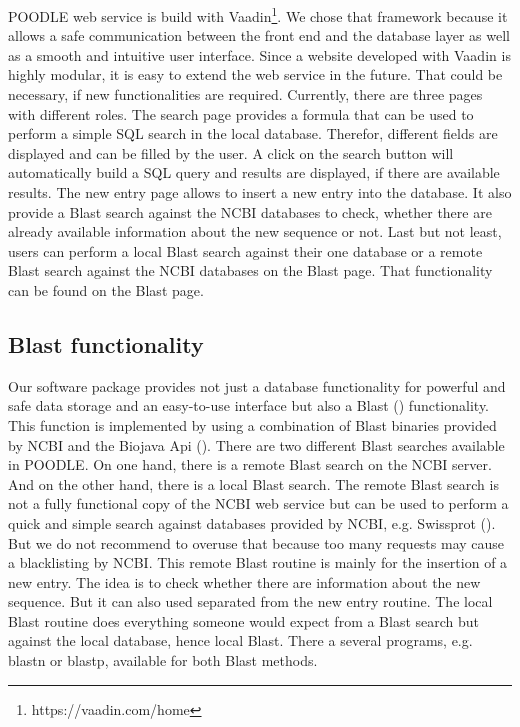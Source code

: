 \documentclass{bioinfo}
\begin{document}
\begin{methods}
POODLE web service is build with Vaadin\footnote{https://vaadin.com/home}. We chose that framework 
because it allows a safe 
communication between the front end and the database layer as well as a smooth and intuitive user 
interface. Since a website developed with Vaadin is highly modular, it is easy to extend the web 
service in the future. That could be necessary, if new functionalities are required. Currently, 
there are three pages with different roles. The search page provides a formula that can be used 
to perform a simple SQL search in the local database. Therefor, different fields are displayed and 
can be filled by the user. A click on the search button will automatically build a SQL query and 
results are displayed, if there are available results. The new entry page allows to insert a new 
entry into the database. It also provide a Blast search against the NCBI databases to check, whether 
there are already available information about the new sequence or not. Last but not least, users can 
perform a local Blast search against their one database or a remote Blast search against the NCBI 
databases on the Blast page. That functionality can be found on the Blast page. 

\subsection{Blast functionality}

Our software package provides not just a database functionality for powerful and safe data storage 
and an easy-to-use interface but also a Blast (\citealp{Altschul01}) functionality. This function 
is implemented by using a combination of Blast binaries provided by NCBI and the Biojava Api 
(\citealp{Prlic01}). There are two different Blast searches available in POODLE. On one hand, there 
is a remote Blast search on the NCBI server. And on the other hand, there is a local Blast search. 
The remote Blast search is not a fully functional copy of the NCBI web service but can be used to 
perform a quick and simple search against databases provided by NCBI, e.g. Swissprot (\citealp{Doni01}). But we 
do not recommend to overuse that because too many requests may cause a blacklisting by NCBI. This 
remote Blast routine is mainly for the insertion of a new entry. The idea is to check whether there 
are information about the new sequence. But it can also used separated from the new entry routine. 
The local Blast routine does everything someone would 
expect from a Blast search but against the local database, hence local Blast. There a several programs, 
e.g. blastn or blastp, available for both Blast methods. 

\end{methods}
\end{document}
